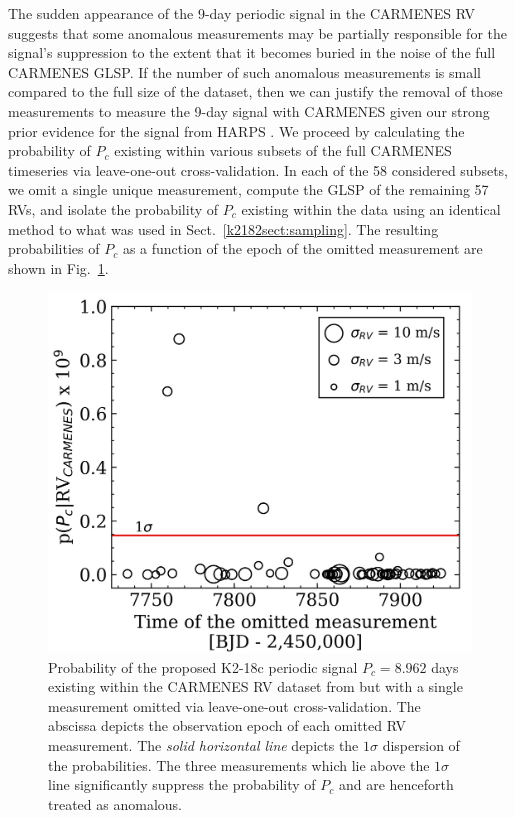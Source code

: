 The sudden appearance of the 9-day periodic signal in the CARMENES RV suggests that some anomalous 
measurements may be partially responsible for the signal's suppression
to the extent that it becomes buried in the noise of the full CARMENES GLSP. If the number of such
anomalous measurements is small compared to the full size of the dataset, then we can justify the removal of those
measurements to measure the 9-day signal with CARMENES given our strong prior evidence for the signal from HARPS
.
We proceed by calculating the probability of $P_c$ existing within various subsets of the full CARMENES timeseries
via leave-one-out cross-validation.
In each of the 58 considered subsets, we omit a single unique measurement, compute the
GLSP of the remaining 57 RVs, and isolate the probability of $P_c$ existing within the data using an identical method
to what was used in Sect.~\ref{k2182sect:sampling}. The resulting probabilities of $P_c$ as a function of the epoch of the
omitted measurement are shown in Fig.~\ref{k2182fig:prob9}.  \\

\begin{figure}
  \centering
  \includegraphics[width=0.6\hsize]{figures/probs9.png}
  \caption[Leave-one-out cross-validation on the CARMENES RV timeseries.]
    {\small Probability of the proposed K2-18c periodic signal $P_c=8.962$ days existing within the
    CARMENES RV dataset from  but with a single measurement omitted via leave-one-out
    cross-validation. The abscissa depicts
    the observation epoch of each omitted RV measurement. The \emph{solid horizontal line} depicts the $1\sigma$
    dispersion of the probabilities. The three measurements which lie above the $1\sigma$ line significantly
    suppress the probability of $P_c$ and are henceforth treated as anomalous.}
  \label{k2182fig:prob9}
\end{figure}

